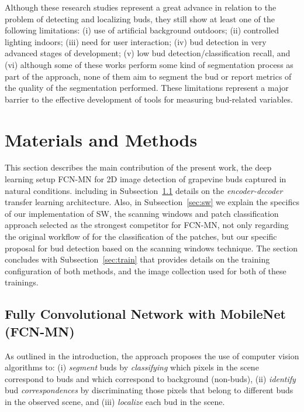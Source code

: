 \documentclass[a4paper,authoryear,review]{elsarticle}
\begin{document}
	Although these research studies represent a great advance in relation to the problem of detecting and localizing buds, they still show at least one of the following limitations: (i) use of artificial background outdoors; (ii) controlled lighting indoors; (iii) need for user interaction; (iv) bud detection in very advanced stages of development; (v) low bud detection/classification recall, and (vi) although some of these works perform some kind of segmentation process as part of the approach, none of them aim to segment the bud or report metrics of the quality of the segmentation performed. These limitations represent a major barrier to the effective development of tools for measuring bud-related variables. 
	
	\section{Materials and Methods}
	\label{sec:matmet}
	
	This section describes the main contribution of the present work, the deep learning setup FCN-MN for 2D image detection of grapevine buds captured in natural conditions. including in Subsection~\ref{sec:fcn} details on the \emph{encoder-decoder} transfer learning architecture. 
	Also, in Subsection~\ref{sec:sw} we explain the specifics of our implementation of SW, the scanning windows and patch classification approach selected as the strongest competitor for FCN-MN, not only regarding the original workflow of \citet{perez2017image} for the classification of the patches, but our specific proposal for bud detection based on the scanning windows technique.
	The section concludes with Subsection~\ref{sec:train} that provides details on the training configuration of both methods, and the image collection used for both of these trainings.
	
	\subsection{Fully Convolutional Network with MobileNet (FCN-MN)}
	\label{sec:fcn}
	
	As outlined in the introduction, the approach proposes the use of computer vision algorithms to: (i) \emph{segment} buds by \emph{classifying} which pixels in the scene correspond to buds and which correspond to background (non-buds), (ii) \emph{identify} bud \emph{correspondences} by discriminating those pixels that belong to different buds in the observed scene, and (iii) \emph{localize} each bud in the scene. 
	
\end{document}
